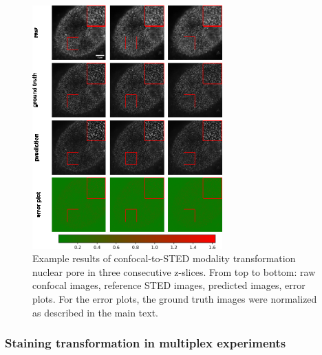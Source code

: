 \begin{figure}
\hypertarget{fig:modality_np}{%
\centering
\includegraphics[width=0.65\textwidth,height=0.7\textheight]{images/np_manuscript.png}
\caption{Example results of confocal-to-STED modality transformation nuclear pore in three consecutive z-slices. From top to bottom: raw confocal images, reference STED images, predicted images, error plots. For the error plots, the ground truth images were normalized as described in the main text.}\label{fig:modality_np}
}
\end{figure}

\hypertarget{staining-transformation-in-multiplex-experiments}{%
\subsubsection{Staining transformation in multiplex experiments}\label{staining-transformation-in-multiplex-experiments}}

